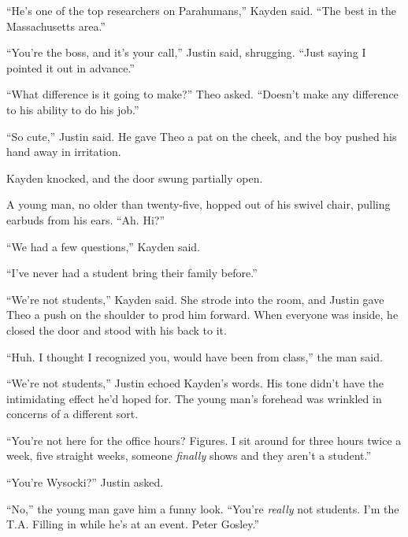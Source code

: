 ``He's one of the top researchers on Parahumans,'' Kayden said.  ``The best in the Massachusetts area.''



``You're the boss, and it's your call,'' Justin said, shrugging.  ``Just saying I pointed it out in advance.''



``What difference is it going to make?'' Theo asked.  ``Doesn't make any difference to his ability to do his job.''



``So cute,'' Justin said.  He gave Theo a pat on the cheek, and the boy pushed his hand away in irritation.



Kayden knocked, and the door swung partially open.



A young man, no older than twenty-five, hopped out of his swivel chair, pulling earbuds from his ears.  ``Ah.  Hi?''



``We had a few questions,'' Kayden said.



``I've never had a student bring their family before.''



``We're not students,'' Kayden said.  She strode into the room, and Justin gave Theo a push on the shoulder to prod him forward.  When everyone was inside, he closed the door and stood with his back to it.



``Huh.  I thought I recognized you, would have been from class,'' the man said.



``We're not students,'' Justin echoed Kayden's words.  His tone didn't have the intimidating effect he'd hoped for.  The young man's forehead was wrinkled in concerns of a different sort.



``You're not here for the office hours?  Figures.  I sit around for three hours twice a week, five straight weeks, someone \emph{finally} shows and they aren't a student.''



``You're Wysocki?'' Justin asked.



``No,'' the young man gave him a funny look.  ``You're \emph{really} not students.  I'm the T.A.  Filling in while he's at an event.  Peter Gosley.''



